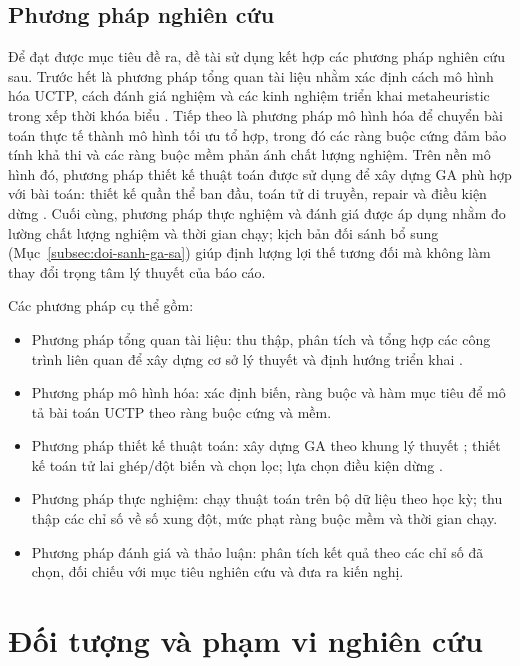 \documentclass[a4paper,12pt,oneside]{article}
\begin{document}
	\subsection*{Phương pháp nghiên cứu}
	
	Để đạt được mục tiêu đề ra, đề tài sử dụng kết hợp các phương pháp nghiên cứu sau. Trước hết là phương pháp tổng quan tài liệu nhằm xác định cách mô hình hóa UCTP, cách đánh giá nghiệm và các kinh nghiệm triển khai metaheuristic trong xếp thời khóa biểu \cite{schaerf1999survey,qu2009survey}. Tiếp theo là phương pháp mô hình hóa để chuyển bài toán thực tế thành mô hình tối ưu tổ hợp, trong đó các ràng buộc cứng đảm bảo tính khả thi và các ràng buộc mềm phản ánh chất lượng nghiệm. Trên nền mô hình đó, phương pháp thiết kế thuật toán được sử dụng để xây dựng GA phù hợp với bài toán: thiết kế quần thể ban đầu, toán tử di truyền, repair và điều kiện dừng \cite{goldberg1989genetic,burke1997automated,lewis2008survey}. Cuối cùng, phương pháp thực nghiệm và đánh giá được áp dụng nhằm đo lường chất lượng nghiệm và thời gian chạy; kịch bản đối sánh bổ sung (Mục~\ref{subsec:doi-sanh-ga-sa}) giúp định lượng lợi thế tương đối mà không làm thay đổi trọng tâm lý thuyết của báo cáo.
	
	Các phương pháp cụ thể gồm:
	\begin{itemize}
		\item Phương pháp tổng quan tài liệu: thu thập, phân tích và tổng hợp các công trình liên quan để xây dựng cơ sở lý thuyết và định hướng triển khai \cite{schaerf1999survey,lewis2008survey}.
		\item Phương pháp mô hình hóa: xác định biến, ràng buộc và hàm mục tiêu để mô tả bài toán UCTP theo ràng buộc cứng và mềm.
		\item Phương pháp thiết kế thuật toán: xây dựng GA theo khung lý thuyết \cite{goldberg1989genetic,eiben2015introduction}; thiết kế toán tử lai ghép/đột biến và chọn lọc; lựa chọn điều kiện dừng \cite{burke1997automated,lewis2008survey}.
		\item Phương pháp thực nghiệm: chạy thuật toán trên bộ dữ liệu theo học kỳ; thu thập các chỉ số về số xung đột, mức phạt ràng buộc mềm và thời gian chạy.
		\item Phương pháp đánh giá và thảo luận: phân tích kết quả theo các chỉ số đã chọn, đối chiếu với mục tiêu nghiên cứu và đưa ra kiến nghị.
	\end{itemize}
	
	\section*{Đối tượng và phạm vi nghiên cứu}
	
\end{document}

